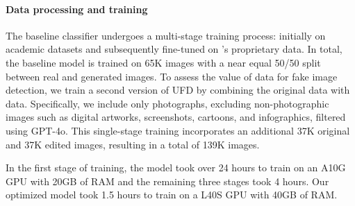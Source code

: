 

\paragraph{Data processing and training}
\label{UFD_training}
The baseline classifier undergoes a multi-stage training process: initially on academic datasets and subsequently fine-tuned on \truemedia's proprietary data. In total, the baseline model is trained on 65K images with a near equal 50/50 split between real and generated images. To assess the value of \ours data for fake image detection, we train a second version of UFD by combining the original data with \ours data. Specifically, we include only photographs, excluding non-photographic images such as digital artworks, screenshots, cartoons, and infographics, filtered using GPT-4o. This single-stage training incorporates an additional 37K original and 37K edited images, resulting in a total of 139K images.

In the first stage of training, the \truemedia model took over 24 hours to train on an A10G GPU with 20GB of RAM and the remaining three stages took 4 hours. Our optimized model took 1.5 hours to train on a L40S GPU with 40GB of RAM.\\





